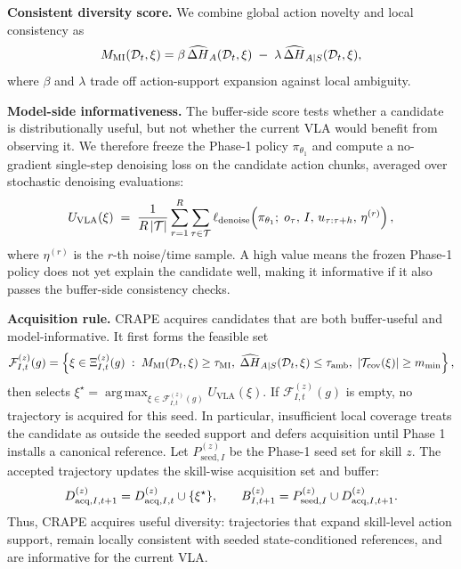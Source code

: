 \documentclass{article}
\begin{document}
\textbf{Consistent diversity score.}
We combine global action novelty and local consistency as
\begin{equation} \small
M_{\mathrm{MI}}(\mathcal{D}_t,\xi)
=
\beta\,
\widehat{\Delta H}_A(\mathcal{D}_t,\xi)
\;-\;
\lambda\,
\widehat{\Delta H}_{A \mid S}(\mathcal{D}_t,\xi),
\label{eq:p2-mi-score}
\end{equation}
where $\beta$ and $\lambda$ trade off action-support expansion against local ambiguity.

\textbf{Model-side informativeness.}
The buffer-side score tests whether a candidate is distributionally useful, but not whether the current VLA would benefit from observing it. We therefore freeze the Phase-1 policy $\pi_{\theta_1}$ and compute a no-gradient single-step denoising loss on the candidate action chunks, averaged over stochastic denoising evaluations:
\begin{equation} \small
U_{\mathrm{VLA}}(\xi)
\;=\;
\frac{1}{R\,|\mathcal{T}|}
\sum_{r=1}^{R}
\sum_{\tau \in \mathcal{T}}
\ell_{\mathrm{denoise}}\!\left(
\pi_{\theta_1};\; o_\tau,\, I,\, u_{\tau:\tau+h},\, \eta^{(r)}
\right),
\label{eq:p2-model-info}
\end{equation}
where $\eta^{(r)}$ is the $r$-th noise/time sample. A high value means the frozen Phase-1 policy does not yet explain the candidate well, making it informative if it also passes the buffer-side consistency checks.

\textbf{Acquisition rule.}
CRAPE acquires candidates that are both buffer-useful and model-informative. It first forms the feasible set
\begin{equation} \small
\mathcal{F}_{I,t}^{(z)}(g)
=
\left\{
\xi \in \Xi_{I,t}^{(z)}(g)
\;:\;
M_{\mathrm{MI}}(\mathcal{D}_t,\xi) \ge \tau_{\mathrm{MI}},\;
\widehat{\Delta H}_{A \mid S}(\mathcal{D}_t,\xi) \le \tau_{\mathrm{amb}},\;
|\mathcal{T}_{\mathrm{cov}}(\xi)| \ge m_{\min}
\right\},
\label{eq:p2-acquisition}
\end{equation}
then selects $\xi^\star=\operatorname*{arg\,max}_{\xi\in\mathcal{F}_{I,t}^{(z)}(g)}U_{\mathrm{VLA}}(\xi)$. If $\mathcal{F}_{I,t}^{(z)}(g)$ is empty, no trajectory is acquired for this seed. In particular, insufficient local coverage treats the candidate as outside the seeded support and defers acquisition until Phase 1 installs a canonical reference.
%
Let $P_{\mathrm{seed},I}^{(z)}$ be the Phase-1 seed set for skill $z$. The accepted trajectory updates the skill-wise acquisition set and buffer:
\begin{equation} \small
D_{\mathrm{acq},I,t+1}^{(z)}
=
D_{\mathrm{acq},I,t}^{(z)}
\cup
\{\xi^\star\},
\qquad
B_{I,t+1}^{(z)}
=
P_{\mathrm{seed},I}^{(z)}
\cup
D_{\mathrm{acq},I,t+1}^{(z)}.
\label{eq:p2-commit}
\end{equation}
Thus, CRAPE acquires useful diversity: trajectories that expand skill-level action support, remain locally consistent with seeded state-conditioned references, and are informative for the current VLA.
\end{document}
